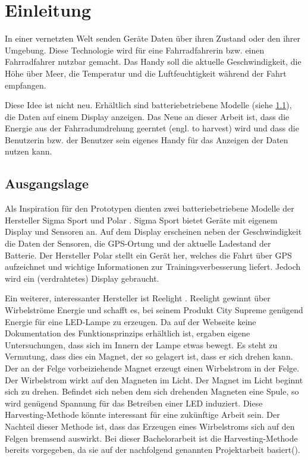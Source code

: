 \chapter{Einleitung}

In einer vernetzten Welt senden Geräte Daten über ihren Zustand oder den ihrer Umgebung. Diese Technologie wird für eine Fahrradfahrerin bzw. einen Fahrradfahrer nutzbar gemacht. Das Handy soll die aktuelle Geschwindigkeit, die Höhe über Meer, die Temperatur und die Luftfeuchtigkeit während der Fahrt empfangen.

Diese Idee ist nicht neu. Erhältlich sind batteriebetriebene Modelle (siehe \ref{ausgang}), die Daten auf einem Display anzeigen. Das Neue an dieser Arbeit ist, dass die Energie aus der Fahrradumdrehung geerntet (engl. to harvest) wird und dass die Benutzerin bzw. der Benutzer sein eigenes Handy für das Anzeigen der Daten nutzen kann.


\section{Ausgangslage}
\label{ausgang}

Als Inspiration für den Prototypen dienten zwei batteriebetriebene Modelle der Hersteller Sigma Sport \cite{SigmaSport} und Polar \cite{PolarElectro}. Sigma Sport bietet Geräte mit eigenem Display und  Sensoren an. Auf dem Display erscheinen neben der Geschwindigkeit die Daten der Sensoren, die GPS-Ortung und der aktuelle Ladestand der Batterie. Der Hersteller Polar stellt ein Gerät her, welches die Fahrt über GPS aufzeichnet und wichtige Informationen zur Trainingsverbesserung liefert. Jedoch wird ein (verdrahtetes) Display gebraucht.

Ein weiterer, interessanter Hersteller ist Reelight  \cite{Reelight}. Reelight gewinnt über Wirbelströme Energie und schafft es, bei seinem Produkt City Supreme genügend Energie für eine LED-Lampe zu erzeugen. Da auf der Webseite keine Dokumentation des Funktionsprinzips erhältlich ist, ergaben eigene Untersuchungen, dass sich im Innern der Lampe \glqq etwas\grqq \medskip {} bewegt. Es steht zu Vermutung, dass dies ein Magnet, der so gelagert ist, dass er sich drehen kann. Der an der Felge vorbeiziehende Magnet erzeugt einen Wirbelstrom in der Felge. Der Wirbelstrom wirkt auf den Magneten im Licht. Der Magnet im Licht beginnt sich zu drehen. Befindet sich neben dem sich drehenden Magneten eine Spule, so wird genügend Spannung für das Betreiben einer LED induziert. Diese Harvesting-Methode könnte interessant für eine zukünftige Arbeit sein. Der Nachteil dieser Methode ist, dass das Erzeugen eines Wirbelstroms sich auf den Felgen bremsend auswirkt.  Bei dieser Bachelorarbeit ist die Harvesting-Methode bereits vorgegeben, da sie auf der nachfolgend genannten Projektarbeit basiert(\cite{PA_bicycle}).

